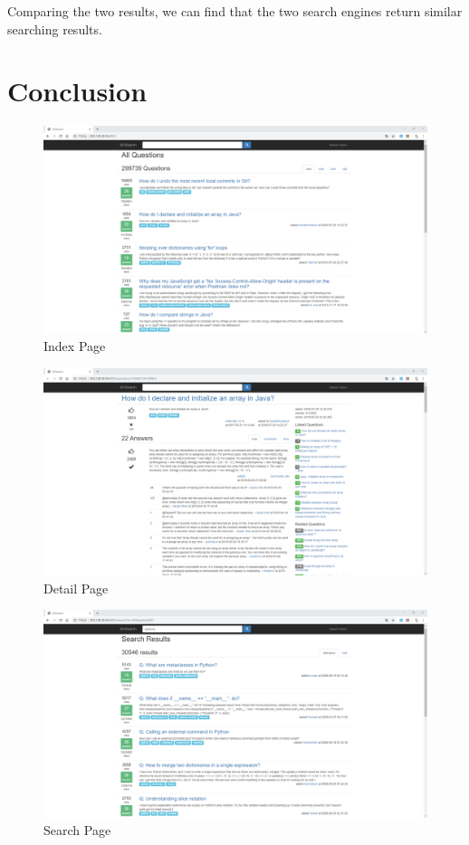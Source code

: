 \documentclass[10pt,journal,compsoc]{IEEEtran}
\begin{document}
Comparing the two results, we can find that the two search engines return similar searching results.

\section{Conclusion}
\label{sec:conclusion}


\begin{figure}[!t]
  \centering
    \includegraphics[width=1\textwidth]{images/large_index.png}
    \caption{Index Page}
    \label{fig:index}
\end{figure}

\begin{figure}[!t]
  \centering
    \includegraphics[width=1\textwidth]{images/large_detail.png}
    \caption{Detail Page}
    \label{fig:detail}
\end{figure}

\begin{figure}[!t]
  \centering
    \includegraphics[width=1\textwidth]{images/large_search.png}
    \caption{Search Page}
    \label{fig:search}
\end{figure}
\end{document}
